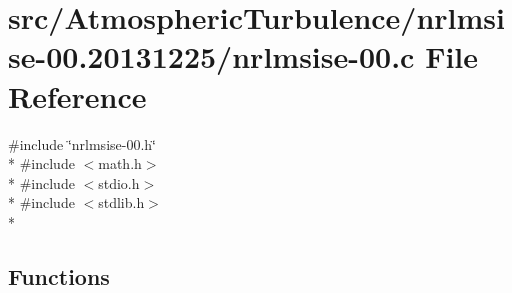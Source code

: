 \hypertarget{nrlmsise-00_8c}{\section{src/\+Atmospheric\+Turbulence/nrlmsise-\/00.20131225/nrlmsise-\/00.c File Reference}
\label{nrlmsise-00_8c}
}
{\ttfamily \#include \char`\"{}nrlmsise-\/00.\+h\char`\"{}}\\*
{\ttfamily \#include $<$math.\+h$>$}\\*
{\ttfamily \#include $<$stdio.\+h$>$}\\*
{\ttfamily \#include $<$stdlib.\+h$>$}\\*
\subsection*{Functions}
